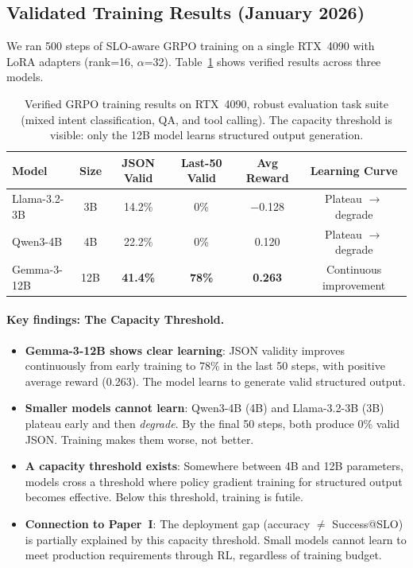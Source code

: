 \documentclass[11pt]{article}
\begin{document}
\subsection{Validated Training Results (January 2026)}

We ran 500 steps of SLO-aware GRPO training on a single RTX~4090 with LoRA adapters (rank=16, $\alpha$=32).
Table~\ref{tab:validation} shows verified results across three models.

\begin{table}[t]
\centering
\caption{Verified GRPO training results on RTX~4090, robust evaluation task suite (mixed intent classification, QA, and tool calling). The capacity threshold is visible: only the 12B model learns structured output generation.}
\label{tab:validation}
\begin{tabular}{l c cccc}
\toprule
\textbf{Model} & \textbf{Size} & \textbf{JSON Valid} & \textbf{Last-50 Valid} & \textbf{Avg Reward} & \textbf{Learning Curve} \\
\midrule
Llama-3.2-3B & 3B & 14.2\% & 0\% & $-$0.128 & Plateau $\rightarrow$ degrade \\
Qwen3-4B & 4B & 22.2\% & 0\% & 0.120 & Plateau $\rightarrow$ degrade \\
Gemma-3-12B & 12B & \textbf{41.4\%} & \textbf{78\%} & \textbf{0.263} & Continuous improvement \\
\bottomrule
\end{tabular}
\end{table}

\paragraph{Key findings: The Capacity Threshold.}
\begin{itemize}[leftmargin=12pt]
    \item \textbf{Gemma-3-12B shows clear learning}: JSON validity improves continuously from early training to 78\% in the last 50 steps, with positive average reward (0.263). The model learns to generate valid structured output.
    \item \textbf{Smaller models cannot learn}: Qwen3-4B (4B) and Llama-3.2-3B (3B) plateau early and then \emph{degrade}. By the final 50 steps, both produce 0\% valid JSON. Training makes them worse, not better.
    \item \textbf{A capacity threshold exists}: Somewhere between 4B and 12B parameters, models cross a threshold where policy gradient training for structured output becomes effective. Below this threshold, training is futile.
    \item \textbf{Connection to Paper~I}: The deployment gap (accuracy $\neq$ Success@SLO) is partially explained by this capacity threshold. Small models cannot learn to meet production requirements through RL, regardless of training budget.
\end{itemize}
\end{document}
